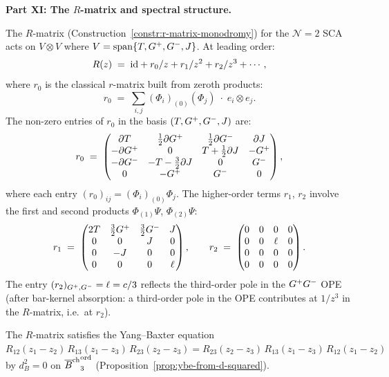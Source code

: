 \begin{computation}
\medskip
\noindent\textbf{Part XI: The $R$-matrix and spectral structure.}

The $R$-matrix
(Construction~\ref{constr:r-matrix-monodromy}) for the
$\mathcal N=2$ SCA acts on
$V\otimes V$ where $V = \operatorname{span}\{T,G^+,G^-,J\}$.
At leading order:
\begin{equation}\label{eq:r-matrix-n2-sca}
R(z) \;=\; \mathrm{id} + r_0/z + r_1/z^2 + r_2/z^3 + \cdots,
\end{equation}
where $r_0$ is the classical $r$-matrix built from zeroth
products:
\begin{equation}\label{eq:classical-r-n2}
r_0 \;=\; \sum_{i,j} (\Phi_i)_{(0)}(\Phi_j)\;\cdot\;
e_i\otimes e_j.
\end{equation}
The non-zero entries of $r_0$ in the basis
$(T,G^+,G^-,J)$ are:
\[
r_0 \;=\;
\begin{pmatrix}
\partial T & \frac12\partial G^+ & \frac12\partial G^- & \partial J \\
-\partial G^+ & 0 & T+\frac12\partial J & -G^+ \\
-\partial G^- & -T-\frac32\partial J & 0 & G^- \\
0 & -G^+ & G^- & 0
\end{pmatrix},
\]
where each entry $(r_0)_{ij} = (\Phi_i)_{(0)}\Phi_j$.
The higher-order terms $r_1$, $r_2$ involve the first and
second products $\Phi_{(1)}\Psi$, $\Phi_{(2)}\Psi$:
\begin{equation}\label{eq:r1-n2}
r_1 \;=\;
\begin{pmatrix}
2T & \frac32G^+ & \frac32G^- & J \\
0 & 0 & J & 0 \\
0 & -J & 0 & 0 \\
0 & 0 & 0 & \ell
\end{pmatrix},
\qquad
r_2 \;=\;
\begin{pmatrix}
0 & 0 & 0 & 0 \\
0 & 0 & \ell & 0 \\
0 & 0 & 0 & 0 \\
0 & 0 & 0 & 0
\end{pmatrix}.
\end{equation}
The entry $(r_2)_{G^+,G^-} = \ell = c/3$ reflects the
third-order pole in the $G^+G^-$ OPE (after bar-kernel
absorption: a third-order pole in the OPE contributes
at $1/z^3$ in the $R$-matrix, i.e.\ at $r_2$).

The $R$-matrix satisfies the Yang--Baxter equation
$R_{12}(z_1{-}z_2)\,R_{13}(z_1{-}z_3)\,R_{23}(z_2{-}z_3)
= R_{23}(z_2{-}z_3)\,R_{13}(z_1{-}z_3)\,R_{12}(z_1{-}z_2)$
by $d_B^2=0$ on ${\overline{B}^{\mathrm{ch}}}^{\mathrm{ord}}_3$
(Proposition~\ref{prop:ybe-from-d-squared}).


\end{computation}
